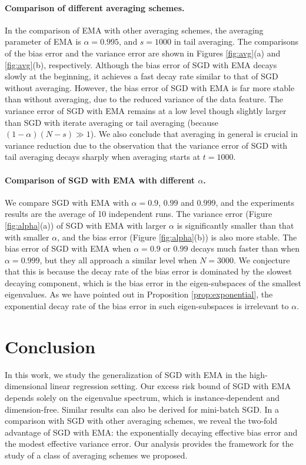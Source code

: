 \documentclass[11pt]{article}
\begin{document}
\paragraph{Comparison of different averaging schemes.}
In the comparison of EMA with other averaging schemes, the averaging parameter of EMA is $\alpha=0.995$, and $s=1000$ in tail averaging. The comparisons of the bias error and the variance error are shown in Figures \ref{fig:avg}(a) and \ref{fig:avg}(b), respectively. Although the bias error of SGD with EMA decays slowly at the beginning, it achieves a fast decay rate similar to that of SGD without averaging. However, the bias error of SGD with EMA is far more stable than without averaging, due to the reduced variance of the data feature. The variance error of SGD with EMA remains at a low level though slightly larger than SGD with iterate averaging or tail averaging (because $(1-\alpha)(N-s)\gg1$). We also conclude that averaging in general is crucial in variance reduction due to the observation that the variance error of SGD with tail averaging decays sharply when averaging starts at $t=1000$.

\paragraph{Comparison of SGD with EMA with different $\alpha$.}
We compare SGD with EMA with $\alpha=0.9$, $0.99$ and $0.999$, and the experiments results are the average of 10 independent runs.
The variance error (Figure \ref{fig:alpha}(a)) of SGD with EMA with larger $\alpha$ is significantly smaller than that with smaller $\alpha$, and the bias error (Figure \ref{fig:alpha}(b)) is also more stable.
The bias error of SGD with EMA when $\alpha=0.9$ or $0.99$ decays much faster than when $\alpha=0.999$, but they all approach a similar level when $N=3000$.
We conjecture that this is because the decay rate of the bias error is dominated by the slowest decaying component, which is the bias error in the eigen-subspaces of the smallest eigenvalues. As we have pointed out in Proposition \ref{prop:exponential}, the exponential decay rate of the bias error in such eigen-subspaces is irrelevant to $\alpha$.

\section{Conclusion}

In this work, we study the generalization of SGD with EMA in the high-dimensional linear regression setting.
Our excess risk bound of SGD with EMA depends solely on the eigenvalue spectrum, which is instance-dependent and dimension-free.
Similar results can also be derived for mini-batch SGD.
In a comparison with SGD with other averaging schemes, we reveal the two-fold advantage of SGD with EMA: the exponentially decaying effective bias error and the modest effective variance error.
Our analysis provides the framework for the study of a class of averaging schemes we proposed.
\end{document}
